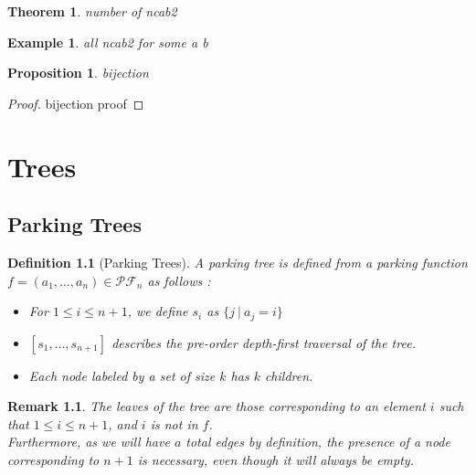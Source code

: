 \documentclass[12pt]{report}
\newtheorem{theorem}{Theorem}
\newtheorem*{prop}{Proposition}
\newtheorem{definition}{Definition}
\newtheorem*{example}{Example}
\newtheorem*{rem}{Remark}
\begin{document}
\begin{theorem}
    number of ncab2
\end{theorem}

\begin{example}
    all ncab2 for some a b
\end{example}

\begin{prop}
    bijection
\end{prop}

\begin{proof}
    bijection proof
\end{proof}

\chapter{Trees}

\section{Parking Trees}

\begin{definition}[Parking Trees]
    A \emph{parking tree} is defined from a parking
    function $f = (a_1, \ldots, a_n) \in \mathcal{PF}_n$
    as follows :
    \begin{itemize}
        \item For $1 \leqslant i \leqslant n+1$, we define
            $s_i$ as $\{j\ |\ a_j = i\}$
        \item $[s_1, \ldots, s_{n+1}]$ describes the 
        pre-order depth-first traversal of the tree.
        \item Each node labeled by a set of size $k$
            has $k$ children. 
    \end{itemize}
\end{definition}

\begin{rem}
    The leaves of the tree are those corresponding to an
    element $i$ such that $1 \leqslant i \leqslant n + 1$,
    and $i$ is \emph{not} in $f$.\\
    Furthermore, as we will have $a$ total edges by 
    definition, the presence of a node corresponding
    to $n + 1$ is necessary, even though it will always
    be empty.
\end{rem}
\end{document}
